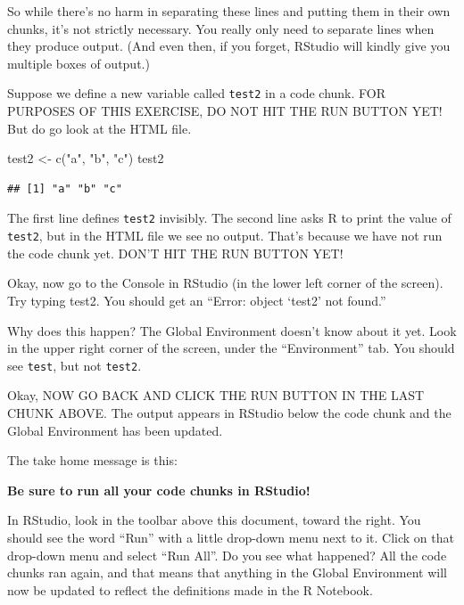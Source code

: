 \documentclass[
]{book}
\newenvironment{Shaded}{\begin{snugshade}}{\end{snugshade}}
\newcommand{\FunctionTok}[1]{\textcolor[rgb]{0.00,0.00,0.00}{#1}}
\newcommand{\NormalTok}[1]{#1}
\newcommand{\OtherTok}[1]{\textcolor[rgb]{0.56,0.35,0.01}{#1}}
\newcommand{\StringTok}[1]{\textcolor[rgb]{0.31,0.60,0.02}{#1}}
\begin{document}
So while there's no harm in separating these lines and putting them in their own chunks, it's not strictly necessary. You really only need to separate lines when they produce output. (And even then, if you forget, RStudio will kindly give you multiple boxes of output.)

Suppose we define a new variable called \texttt{test2} in a code chunk. FOR PURPOSES OF THIS EXERCISE, DO NOT HIT THE RUN BUTTON YET! But do go look at the HTML file.

\begin{Shaded}
\begin{Highlighting}[]
\NormalTok{test2 }\OtherTok{\textless{}{-}} \FunctionTok{c}\NormalTok{(}\StringTok{"a"}\NormalTok{, }\StringTok{"b"}\NormalTok{, }\StringTok{"c"}\NormalTok{)}
\NormalTok{test2}
\end{Highlighting}
\end{Shaded}

\begin{verbatim}
## [1] "a" "b" "c"
\end{verbatim}

The first line defines \texttt{test2} invisibly. The second line asks R to print the value of \texttt{test2}, but in the HTML file we see no output. That's because we have not run the code chunk yet. DON'T HIT THE RUN BUTTON YET!

Okay, now go to the Console in RStudio (in the lower left corner of the screen). Try typing test2. You should get an ``Error: object `test2' not found.''

Why does this happen? The Global Environment doesn't know about it yet. Look in the upper right corner of the screen, under the ``Environment'' tab. You should see \texttt{test}, but not \texttt{test2}.

Okay, NOW GO BACK AND CLICK THE RUN BUTTON IN THE LAST CHUNK ABOVE. The output appears in RStudio below the code chunk and the Global Environment has been updated.

The take home message is this:

\textbf{Be sure to run all your code chunks in RStudio!}

In RStudio, look in the toolbar above this document, toward the right. You should see the word ``Run'' with a little drop-down menu next to it. Click on that drop-down menu and select ``Run All''. Do you see what happened? All the code chunks ran again, and that means that anything in the Global Environment will now be updated to reflect the definitions made in the R Notebook.
\end{document}
